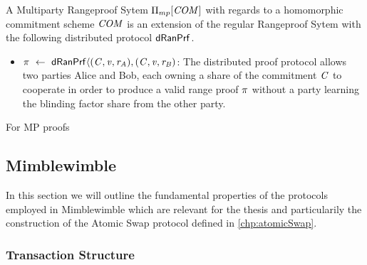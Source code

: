 \begin{definition}
    A Multiparty Rangeproof Sytem $\Pi_{mp}[\mathit{COM}]$ with regards to a homomorphic commitment scheme $\mathit{COM}$ is an extension of the regular Rangeproof Sytem with the following
    distributed protocol $\mathsf{dRanPrf}$.
    \begin{itemize}
        \item $\pi ~\leftarrow~ \mathsf{dRanPrf} \langle(\mathit{C},\mathit{v},\mathit{r}_{\mathit{A}}),(\mathit{C},\mathit{v},\mathit{r}_{\mathit{B}})$: The distributed proof protocol allows two parties Alice and Bob, each owning a share of the
        commitment $\mathit{C}$ to cooperate in order to produce a valid range proof $\pi$ without a party learning the blinding factor share from the other party.
    \end{itemize}
\end{definition}

For MP proofs \cite{klinec2020privacy}

\subsection{Mimblewimble}\label{sec:Mimblewimble}
In this section we will outline the fundamental properties of the protocols employed in Mimblewimble which are relevant for the thesis and particularily the construction of the Atomic Swap protocol defined in
\ref{chp:atomicSwap}.
\subsubsection{Transaction Structure}


